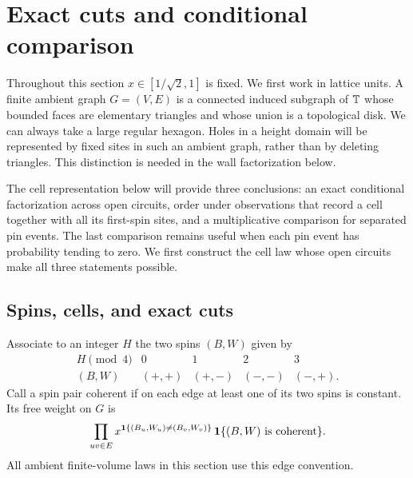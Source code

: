 \section{Exact cuts and conditional comparison}\label{sec:discrete}

Throughout this section $x\in[1/\sqrt2,1]$ is fixed. We first work in lattice
units. A finite ambient graph $G=(V,E)$ is a connected induced subgraph of
$\mathbb T$ whose bounded faces are elementary triangles and whose union is a
topological disk. We can always take a
large regular hexagon. Holes in a height domain will be represented by fixed
sites in such an ambient graph, rather than by deleting triangles. This
distinction is needed in the wall factorization below.

The cell representation below will provide three conclusions: an exact conditional
factorization across open circuits, order under observations that record a
cell together with all its first-spin sites, and a multiplicative comparison
for separated pin events.  The last comparison remains useful when each pin
event has probability tending to zero.  We first construct the cell law
whose open circuits make all three statements possible.

\subsection{Spins, cells, and exact cuts}

Associate to an integer $H$ the two spins $(B,W)$ given by
\begin{equation}\label{discrete:gray}
\begin{array}{c|cccc}
H\pmod4&0&1&2&3\\ \hline
(B,W)&(+,+)&(+,-)&(-,-)&(-,+).
\end{array}
\end{equation}
Call a spin pair coherent if on each edge at least one of its two spins is
constant. Its free weight on $G$ is
\begin{equation}\label{discrete:pair-weight}
 \prod_{uv\in E}x^{\mathbf 1\{(B_u,W_u)\ne(B_v,W_v)\}}\,
 \mathbf 1\{(B,W)\text{ is coherent}\}.
\end{equation}
All ambient finite-volume laws in this section use this edge convention.

